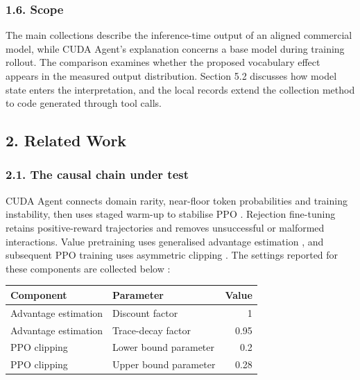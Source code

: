 \documentclass[
  11pt,
]{article}
\begin{document}
\hypertarget{scope}{%
\subsubsection{1.6. Scope}\label{scope}}

The main collections describe the inference-time output of an aligned
commercial model, while CUDA Agent's explanation concerns a base model
during training rollout. The comparison examines whether the proposed
vocabulary effect appears in the measured output distribution. Section
5.2 discusses how model state enters the interpretation, and the local
records extend the collection method to code generated through tool
calls.

\hypertarget{related-work}{%
\subsection{2. Related Work}\label{related-work}}

\hypertarget{the-causal-chain-under-test}{%
\subsubsection{2.1. The causal chain under
test}\label{the-causal-chain-under-test}}

CUDA Agent connects domain rarity, near-floor token probabilities and
training instability, then uses staged warm-up to stabilise PPO
\citep{cudaagent}. Rejection fine-tuning retains positive-reward
trajectories and removes unsuccessful or malformed interactions. Value
pretraining uses generalised advantage estimation \citep{gae}, and
subsequent PPO training uses asymmetric clipping \citep{cudaagent, ppo}.
The settings reported for these components are collected below
\citep{cudaagent}:

\begin{center}
\begin{minipage}{\linewidth}
\centering
\begin{tabular}{@{}llr@{}}
\toprule
Component & Parameter & Value \\
\midrule

Advantage estimation & Discount factor & 1 \\
Advantage estimation & Trace-decay factor & 0.95 \\
PPO clipping & Lower bound parameter & 0.2 \\
PPO clipping & Upper bound parameter & 0.28 \\
\bottomrule
\end{tabular}
\end{minipage}
\end{center}
\end{document}
